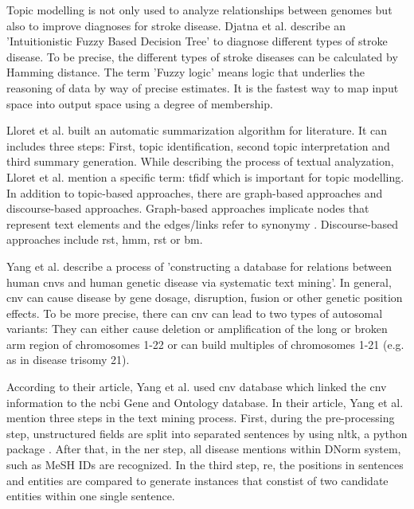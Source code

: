 Topic modelling is not only used to analyze relationships between genomes but also to improve diagnoses for stroke disease. Djatna et al. \autocite{djatna_2018} describe an 'Intuitionistic Fuzzy Based Decision Tree' to diagnose different types of stroke disease. To be precise, the different types of stroke diseases can be calculated by Hamming distance. The term 'Fuzzy logic' means logic that underlies the reasoning of data by way of precise estimates. It is the fastest way to map input space into output space using a degree of membership.

Lloret et al. \autocite{lloret_2012} built an automatic summarization algorithm for literature. It can includes three steps: First, topic identification, second topic interpretation and third summary generation. While describing the process of textual analyzation, Lloret et al. mention a specific term: \gls{tfidf} which is important for topic modelling. In addition to topic-based approaches, there are graph-based approaches and discourse-based approaches. Graph-based approaches implicate nodes that represent text elements and the edges/links refer to synonymy \autocite{lloret_2012}. Discourse-based approaches include \gls{rst}, \gls{hmm}, \gls{rst} or \gls{bm}. 

Yang et al. \autocite{yang_2018} describe a process of 'constructing a database for relations between human \gls{cnv}s and human genetic disease via systematic text mining'. In general, \gls{cnv} can cause disease by gene dosage, disruption, fusion or other genetic position effects. 
To be more precise, there can \gls{cnv} can lead to two types of autosomal variants: They can either cause deletion or amplification of the long or broken arm region of chromosomes 1-22 or can build multiples of chromosomes 1-21 (e.g. as in disease trisomy 21). 

According to their article, Yang et al. used \gls{cnv} database which linked the \gls{cnv} information to the \gls{ncbi} Gene and Ontology database. In their article, Yang et al.\autocite{yang_2018} mention three steps in the text mining process. First, during the pre-processing step, unstructured fields are split into separated sentences by using \gls{nltk}, a python package \autocite{nltk}. After that, in the \gls{ner} step, all disease mentions within DNorm system, such as MeSH IDs are recognized. In the third step, \gls{re}, the positions in sentences and entities are compared to generate instances that constist of two candidate entities within one single sentence.

